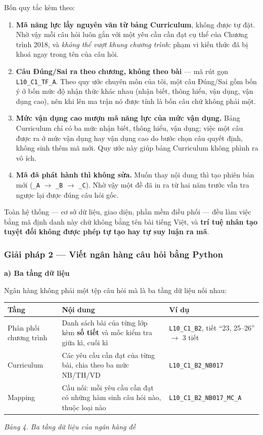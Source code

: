 Bốn quy tắc kèm theo:

\begin{enumerate}[label=(\arabic*), leftmargin=1.2cm, itemsep=3pt]
  \item \textbf{Mã năng lực lấy nguyên văn từ bảng Curriculum}, không được tự
        đặt. Nhờ vậy mỗi câu hỏi luôn gắn với một yêu cầu cần đạt cụ thể của
        Chương trình 2018, và \textit{không thể vượt khung chương trình}: phạm
        vi kiến thức đã bị khoá ngay trong tên của câu hỏi.
  \item \textbf{Câu Đúng/Sai ra theo chương, không theo bài} --- mã rút gọn
        \texttt{L10\_C1\_TF\_A}. Theo quy ước chuyên môn của tôi, một câu
        Đúng/Sai gồm bốn ý ở bốn mức độ nhận thức khác nhau (nhận biết, thông
        hiểu, vận dụng, vận dụng cao), nên khi lên ma trận nó được tính là bốn
        câu chứ không phải một.
  \item \textbf{Mức vận dụng cao mượn mã năng lực của mức vận dụng.} Bảng
        Curriculum chỉ có ba mức nhận biết, thông hiểu, vận dụng; việc một câu
        được ra ở mức vận dụng hay vận dụng cao do bước chọn câu quyết định,
        không sinh thêm mã mới. Quy ước này giúp bảng Curriculum không phình
        ra vô ích.
  \item \textbf{Mã đã phát hành thì không sửa.} Muốn thay nội dung thì tạo
        phiên bản mới (\texttt{\_A} $\to$ \texttt{\_B} $\to$ \texttt{\_C}). Nhờ
        vậy một đề đã in ra từ hai năm trước vẫn tra ngược lại được đúng câu
        hỏi gốc.
\end{enumerate}

Toàn hệ thống --- cơ sở dữ liệu, giao diện, phần mềm điều phối --- đều làm việc
bằng mã định danh này chứ không bằng tên bài tiếng Việt, và \textbf{trí tuệ
nhân tạo tuyệt đối không được phép tự tạo hay tự suy luận ra mã}.

\subsubsection{Giải pháp 2 --- Viết ngân hàng câu hỏi bằng Python}

\textbf{a) Ba tầng dữ liệu}

Ngân hàng không phải một tệp câu hỏi mà là ba tầng dữ liệu nối nhau:

\begin{center}
\begin{tabular}{|p{2.6cm}|p{5.2cm}|p{5.6cm}|}
\hline
\textbf{Tầng} & \textbf{Nội dung} & \textbf{Ví dụ} \\ \hline
Phân phối chương trình & Danh sách bài của từng lớp kèm \textbf{số tiết} và mốc kiểm tra giữa kì, cuối kì &
\texttt{L10\_C1\_B2}, tiết ``23, 25--26'' $\to$ 3 tiết \\ \hline
Curriculum & Các yêu cầu cần đạt của từng bài, chia theo ba mức NB/TH/VD &
\texttt{L10\_C1\_B2\_NB017} \\ \hline
Mapping & Cầu nối: mỗi yêu cầu cần đạt có những hàm sinh câu hỏi nào, thuộc loại nào &
\texttt{L10\_C1\_B2\_NB017\_MC\_A} \\ \hline
\end{tabular}
\end{center}
\textit{Bảng 4. Ba tầng dữ liệu của ngân hàng đề}

